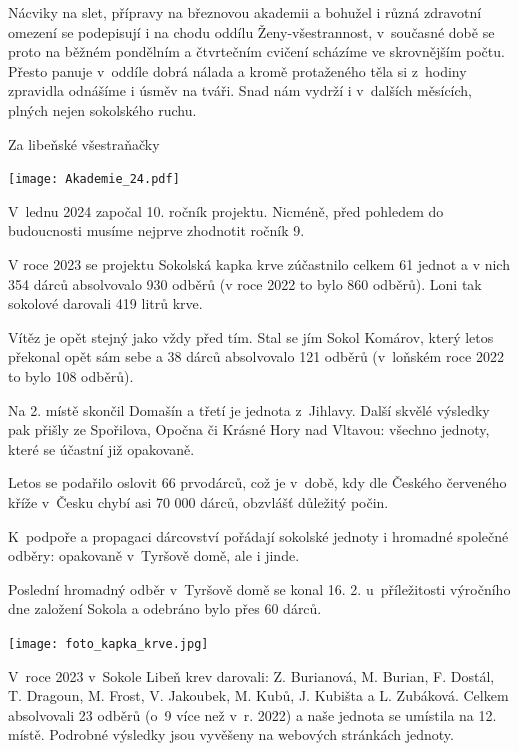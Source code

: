 \documentclass[11pt]{article}
\begin{document}
\vspace*{24pt}

Nácviky na slet, přípravy na březnovou akademii a bohužel i různá zdravotní omezení se podepisují i na chodu oddílu Ženy-všestrannost, v~současné době se proto na běžném pondělním a čtvrtečním cvičení scházíme ve skrovnějším počtu. Přesto panuje v~oddíle dobrá nálada a kromě protaženého těla si z~hodiny zpravidla odnášíme i úsměv na tváři. Snad nám vydrží i v~dalších měsících, plných nejen sokolského ruchu.   

Za libeňské všestraňačky

\signature{Dubina}{}

\clearpage

\pagestyle{blank}
\begin{center}
  \noindent\texttt{[image: Akademie\_24.pdf]}
\end{center}
\restoregeometry

\clearpage
\pagestyle{standard}

V~lednu 2024 započal 10. ročník projektu. Nicméně, před pohledem do budoucnosti musíme nejprve zhodnotit ročník 9.

V roce 2023 se projektu Sokolská kapka krve zúčastnilo celkem 61 jednot a v nich 354 dárců absolvovalo 930 odběrů (v roce 2022 to bylo 860 odběrů). Loni tak sokolové darovali 419 litrů krve.

Vítěz je opět stejný jako vždy před tím. Stal se jím Sokol Komárov, který letos překonal opět sám sebe a 38 dárců absolvovalo 121 odběrů (v~loňském roce 2022 to bylo 108 odběrů).

Na 2. místě skončil Domašín a třetí je jednota z~Jihlavy. Další skvělé výsledky pak přišly ze Spořilova, Opočna či Krásné Hory nad Vltavou: všechno jednoty, které se účastní již opakovaně.

Letos se podařilo oslovit 66 prvodárců, což je v~době, kdy dle Českého červeného kříže v~Česku chybí asi 70 000 dárců, obzvlášť důležitý počin. 

K~podpoře a propagaci dárcovství pořádají sokolské jednoty i hromadné společné odběry: opakovaně v~Tyršově domě, ale i jinde.

Poslední hromadný odběr v~Tyršově domě se konal 16. 2. u~příležitosti výročního dne založení Sokola a odebráno bylo přes 60 dárců. 

\vfill
\noindent\texttt{[image: foto\_kapka\_krve.jpg]}
\vfill
\clearpage

V~roce 2023 v~Sokole Libeň krev darovali: Z. Burianová, M. Burian, F. Dostál, T. Dragoun, M. Frost, V. Jakoubek, M. Kubů, J. Kubišta a L. Zubáková. Celkem absolvovali 23 odběrů (o~9 více než v~r. 2022) a naše jednota se umístila na 12. místě. Podrobné výsledky jsou vyvěšeny na webových stránkách jednoty. 
\end{document}
